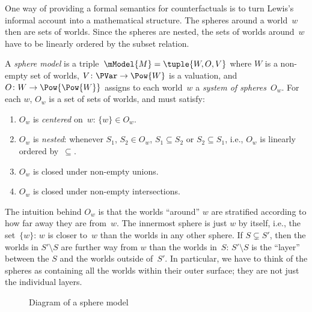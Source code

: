 \documentclass[../../../include/open-logic-section]{subfiles}
\begin{document}


One way of providing a formal semantics for counterfactuals is to turn
Lewis's informal account into a mathematical structure. The spheres
around a world~$w$ then are sets of worlds. Since the spheres are
nested, the sets of worlds around~$w$ have to be linearly ordered by
the subset relation.

\begin{defn}
  A \emph{sphere model} is a triple~$\mModel{M} = \tuple{W, O, V}$
  where $W$ is a non-empty set of worlds, $V\colon \PVar \to \Pow{W}$
  is a valuation, and $O\colon W \to \Pow{\Pow{W}}$ assigns to each
  world~$w$ a \emph{system of spheres}~$O_w$. For each $w$, $O_w$ is a
  set of sets of worlds, and must satisfy:
  \begin{enumerate}
  \item $O_w$ is \emph{centered} on~$w$: $\{w\} \in O_w$.
  \item $O_w$ is \emph{nested}: whenever $S_1$, $S_2 \in O_w$, $S_1
    \subseteq S_2$ or $S_2 \subseteq S_1$, i.e., $O_w$ is linearly
    ordered by~$\subseteq$.
  \item $O_w$ is closed under non-empty unions.
  \item $O_w$ is closed under non-empty intersections.
  \end{enumerate}
\end{defn}

The intuition behind $O_w$ is that the worlds ``around'' $w$ are
stratified according to how far away they are from~$w$. The innermost
sphere is just $w$ by itself, i.e., the set~$\{w\}$: $w$ is closer
to~$w$ than the worlds in any other sphere. If $S \subsetneq S'$, then
the worlds in $S' \setminus S$ are further way from $w$ than the
worlds in~$S$: $S' \setminus S$ is the ``layer'' between the $S$ and
the worlds outside of~$S'$. In particular, we have to think of the
spheres as containing all the worlds within their outer surface; they
are not just the individual layers.

\begin{figure}
\begin{center}
\caption{Diagram of a sphere model}
\end{center}
\end{figure}
\end{document}
